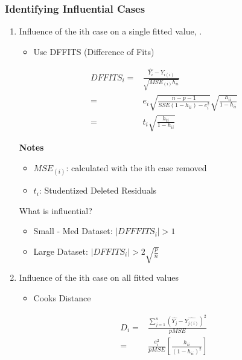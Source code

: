 \documentclass[11pt]{article}
\begin{document}
\subsubsection{Identifying Influential Cases}
\label{sec:orgdad0ff8}
\begin{enumerate}
\item Influence of the ith case on a single fitted value, .
\label{sec:org1c08268}
\begin{itemize}
\item Use DFFITS (Difference of Fits)
\end{itemize}

\begin{equation}
\begin{split}
DFFITS_i = & \frac{\hat{Y_i} - Y_{i(i)}}{\sqrt{MSE_{(i)} h_{ii}}}\\
= & e_i \sqrt{\frac{n - p - 1}{SSE(1 - h_{ii}) - e_i^2}} \sqrt{\frac{h_{ii}}{1 - h_{ii}}}\\
= & t_i \sqrt{\frac{h_{ii}}{1 - h_{ii}}}
\end{split}
\end{equation}

\textbf{Notes}
\begin{itemize}
\item \(MSE_{(i)}\): calculated with the ith case removed
\item \(t_i\): Studentized Deleted Residuals
\end{itemize}

What is influential?
\begin{itemize}
\item Small - Med Dataset: \(|DFFFITS_i| > 1\)
\item Large Dataset: \(|DFFITS_i| > 2 \sqrt{\frac{p}{n}}\)
\end{itemize}
\item Influence of the ith case on all fitted values
\label{sec:org9160940}
\begin{itemize}
\item Cooks Distance
\end{itemize}

\begin{equation}
\begin{split}
D_i = & \frac{\sum_{j = 1}^{n} (\hat{Y_j} - \hat{Y_{j(i)}})^2}{p MSE}\\
= & \frac{e_i^2}{p MSE} [\frac{h_{ii}}{(1 - h_{ii})^2}]
\end{split}
\end{equation}


\end{enumerate}
\end{document}
